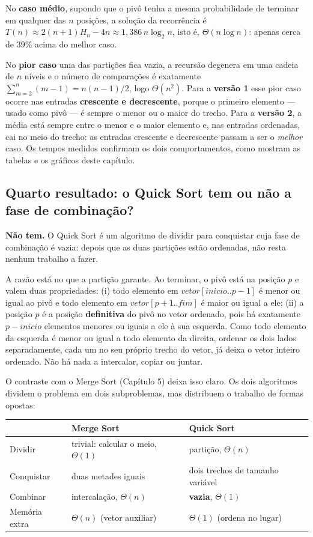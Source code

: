 \qquad No \textbf{caso médio}, supondo que o pivô tenha a mesma
probabilidade de terminar em qualquer das $n$ posições, a solução da
recorrência é $T(n) \approx 2(n+1)H_n - 4n \approx 1{,}386\,n\log_2 n$,
isto é, $\Theta(n \log n)$: apenas cerca de 39\% acima do melhor caso.

\qquad No \textbf{pior caso} uma das partições fica vazia, a recursão
degenera em uma cadeia de $n$ níveis e o número de comparações é
exatamente
$\sum_{m=2}^{n}(m-1) = n(n-1)/2$, logo $\Theta(n^2)$. Para a
\textbf{versão 1} esse pior caso ocorre nas entradas \textbf{crescente
e decrescente}, porque o primeiro elemento --- usado como pivô --- é
sempre o menor ou o maior do trecho. Para a \textbf{versão 2}, a média
está sempre entre o menor e o maior elemento e, nas entradas
ordenadas, cai no meio do trecho: as entradas crescente e decrescente
passam a ser o \textit{melhor} caso. Os tempos medidos confirmam os
dois comportamentos, como mostram as tabelas e os gráficos deste
capítulo.

\subsection{Quarto resultado: o Quick Sort tem ou não a fase de combinação?}

\qquad \textbf{Não tem.} O Quick Sort é um algoritmo de dividir para
conquistar cuja fase de combinação é vazia: depois que as duas
partições estão ordenadas, não resta nenhum trabalho a fazer.

\qquad A razão está no que a partição garante. Ao terminar, o pivô
está na posição $p$ e valem duas propriedades: (i) todo elemento em
$vetor[inicio..p-1]$ é menor ou igual ao pivô e todo elemento em
$vetor[p+1..fim]$ é maior ou igual a ele; (ii) a posição $p$ é a
posição \textbf{definitiva} do pivô no vetor ordenado, pois há
exatamente $p - inicio$ elementos menores ou iguais a ele à sua
esquerda. Como todo elemento da esquerda é menor ou igual a todo
elemento da direita, ordenar os dois lados separadamente, cada um no
seu próprio trecho do vetor, já deixa o vetor inteiro ordenado. Não há
nada a intercalar, copiar ou juntar.

\qquad O contraste com o Merge Sort (Capítulo 5) deixa isso claro. Os
dois algoritmos dividem o problema em dois subproblemas, mas
distribuem o trabalho de formas opostas:

\begin{center}
\begin{tabular}{|l|l|l|}
    \hline
     & Merge Sort & Quick Sort \\
    \hline
    Dividir & trivial: calcular o meio, $\Theta(1)$ & partição, $\Theta(n)$ \\
    \hline
    Conquistar & duas metades iguais & dois trechos de tamanho variável \\
    \hline
    Combinar & intercalação, $\Theta(n)$ & \textbf{vazia}, $\Theta(1)$ \\
    \hline
    Memória extra & $\Theta(n)$ (vetor auxiliar) & $\Theta(1)$ (ordena no lugar) \\
    \hline
\end{tabular}
\end{center}

